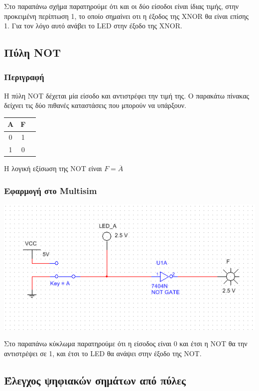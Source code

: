 \documentclass{article}
\begin{document}
Στο παραπάνω σχήμα παρατηρούμε ότι και οι δύο είσοδοι είναι ίδιας τιμής, στην
προκειμένη περίπτωση 1, το οποίο σημαίνει οτι η έξοδος της XNOR θα είναι επίσης 1.
Για τον λόγο αυτό ανάβει το LED στην έξοδο της XNOR.

\subsection{Πύλη NOT}
\subsubsection{Περιγραφή}

Η πύλη NOT δέχεται μία είσοδο και αντιστρέφει την τιμή της. Ο παρακάτω πίνακας δείχνει
τις δύο πιθανές καταστάσεις που μπορούν να υπάρξουν.

\begin{center}
\begin{tabular}{|c|c|c|}
	\hline
	A & F \\
	\hline
	0 & 1  \\
	1 & 0  \\
	\hline
\end{tabular}
\end{center}

Η λογική εξίσωση της NOT είναι $F = \overline{A}$

\subsubsection{Εφαρμογή στο Multisim}
\includegraphics[width=\textwidth]{./res/not.png}

Στο παραπάνω κύκλωμα παρατηρούμε ότι η είσοδος είναι 0 και έτσι η NOT θα την
αντιστρέψει σε 1, και έτσι το LED θα ανάψει στην έξοδο της NOT.

\subsection{Έλεγχος ψηφιακών σημάτων από πύλες}
\end{document}
